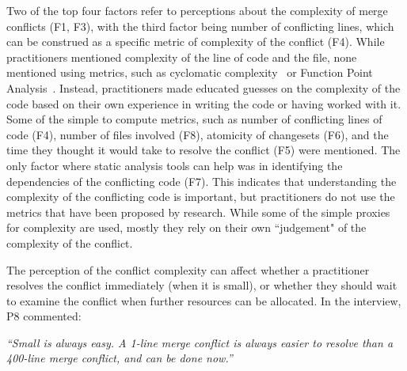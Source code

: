 \label{artifact-based-factors}
Two of the top four factors refer to perceptions about the complexity of merge conflicts (F1, F3), with the third factor being number of conflicting lines, which can be construed as a specific metric of complexity of the conflict (F4). 
While practitioners mentioned complexity of the line of code and the file, none mentioned using metrics, such as cyclomatic complexity~\cite{fenton2000quantitative}\cite{mccabe1976complexity} or Function Point Analysis~\cite{garmus2001fpa}\cite{symons1988function}. 
Instead, practitioners made educated guesses on the complexity of the code based on their own experience in writing the code or having worked with it. 
Some of the simple to compute metrics, such as number of conflicting lines of code (F4), number of files involved (F8), atomicity of changesets (F6), and the time they thought it would take to resolve the conflict (F5) were mentioned. 
The only factor where static analysis tools can help was in identifying the dependencies of the conflicting code (F7).
This indicates that understanding the complexity of the conflicting code is important, but practitioners do not use the metrics that have been proposed by research. While some of the simple proxies for complexity are used, mostly they rely on their own ``judgement" of the complexity of the conflict.



The perception of the conflict complexity can affect whether a practitioner resolves the conflict immediately (when it is small), or whether they should wait to examine the conflict when further resources can be allocated.
In the interview, P8 commented:
\begin{displayquote}
\textit{``Small is always easy. A 1-line merge conflict is always easier to resolve than a 400-line merge conflict, and can be done now.''}
\end{displayquote}

